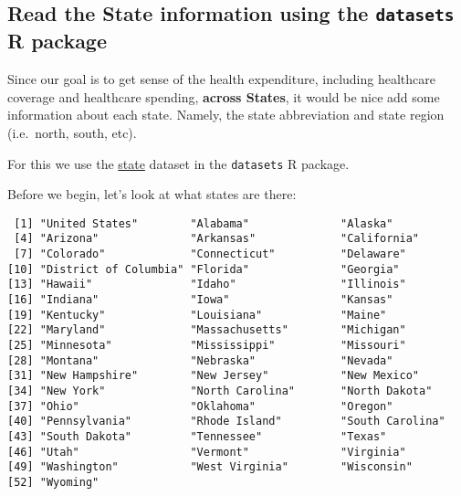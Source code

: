 \documentclass[]{article}
\newenvironment{Shaded}{\begin{snugshade}}{\end{snugshade}}
\newcommand{\KeywordTok}[1]{\textcolor[rgb]{0.13,0.29,0.53}{\textbf{#1}}}
\newcommand{\NormalTok}[1]{#1}
\newcommand{\OperatorTok}[1]{\textcolor[rgb]{0.81,0.36,0.00}{\textbf{#1}}}
\begin{document}
\hypertarget{read-the-state-information-using-the-datasets-r-package}{%
\subsection{\texorpdfstring{Read the State information using the
\texttt{datasets} R
package}{Read the State information using the datasets R package}}\label{read-the-state-information-using-the-datasets-r-package}}

Since our goal is to get sense of the health expenditure, including
healthcare coverage and healthcare spending, \textbf{across States}, it
would be nice add some information about each state. Namely, the state
abbreviation and state region (i.e.~north, south, etc).

For this we use the
\href{https://stat.ethz.ch/R-manual/R-devel/library/datasets/html/state.html}{state}
dataset in the \texttt{datasets} R package.

Before we begin, let's look at what states are there:

\begin{Shaded}
\end{Shaded}

\begin{verbatim}
 [1] "United States"        "Alabama"              "Alaska"              
 [4] "Arizona"              "Arkansas"             "California"          
 [7] "Colorado"             "Connecticut"          "Delaware"            
[10] "District of Columbia" "Florida"              "Georgia"             
[13] "Hawaii"               "Idaho"                "Illinois"            
[16] "Indiana"              "Iowa"                 "Kansas"              
[19] "Kentucky"             "Louisiana"            "Maine"               
[22] "Maryland"             "Massachusetts"        "Michigan"            
[25] "Minnesota"            "Mississippi"          "Missouri"            
[28] "Montana"              "Nebraska"             "Nevada"              
[31] "New Hampshire"        "New Jersey"           "New Mexico"          
[34] "New York"             "North Carolina"       "North Dakota"        
[37] "Ohio"                 "Oklahoma"             "Oregon"              
[40] "Pennsylvania"         "Rhode Island"         "South Carolina"      
[43] "South Dakota"         "Tennessee"            "Texas"               
[46] "Utah"                 "Vermont"              "Virginia"            
[49] "Washington"           "West Virginia"        "Wisconsin"           
[52] "Wyoming"             
\end{verbatim}
\end{document}

